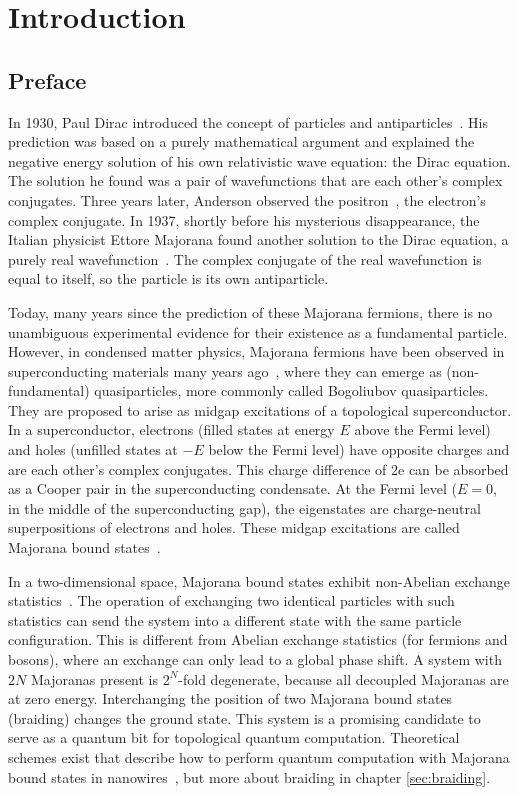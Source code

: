 \chapter{Introduction}
\label{ch:introduction}

\section{Preface}
In 1930, Paul Dirac introduced the concept of particles and antiparticles~\cite{Dirac1930}.
His prediction was based on a purely mathematical argument and explained the negative energy solution of his own relativistic wave equation: the Dirac equation.
The solution he found was a pair of wavefunctions that are each other's complex conjugates.
Three years later, Anderson observed the positron~\cite{Anderson1933}, the electron's complex conjugate.
In 1937, shortly before his mysterious disappearance, the Italian physicist Ettore Majorana found another solution to the Dirac equation, a purely real wavefunction~\cite{Majorana1937}.
The complex conjugate of the real wavefunction is equal to itself, so the particle is its own antiparticle.

Today, many years since the prediction of these Majorana fermions, there is no unambiguous experimental evidence for their existence as a fundamental particle.
However, in condensed matter physics, Majorana fermions have been observed in superconducting materials many years ago~\cite{Kopnin1991}, where they can emerge as (non-fundamental) quasiparticles, more commonly called Bogoliubov quasiparticles.
They are proposed to arise as midgap excitations of a topological superconductor.
In a superconductor, electrons (filled states at energy $E$ above the Fermi level) and holes (unfilled states at $-E$ below the Fermi level) have opposite charges and are each other's complex conjugates.
This charge difference of $2\textrm{e}$ can be absorbed as a Cooper pair in the superconducting condensate.
At the Fermi level ($E=0$, in the middle of the superconducting gap), the eigenstates are charge-neutral superpositions of electrons and holes.
These midgap excitations are called Majorana bound states~\cite{Beenakker2013}.

In a two-dimensional space, Majorana bound states exhibit non-Abelian exchange statistics~\cite{Stern2010}.
The operation of exchanging two identical particles with such statistics can send the system into a different state with the same particle configuration.
This is different from Abelian exchange statistics (for fermions and bosons), where an exchange can only lead to a global phase shift.
A system with $2N$ Majoranas present is $2^{N}$-fold degenerate, because all decoupled Majoranas are at zero energy.
Interchanging the position of two Majorana bound states (braiding) changes the ground state.
This system is a promising candidate to serve as a quantum bit for topological quantum computation.
Theoretical schemes exist that describe how to perform quantum computation with Majorana bound states in nanowires~\cite{Hyart2013,Alicea2011}, but more about braiding in chapter \ref{sec:braiding}.

